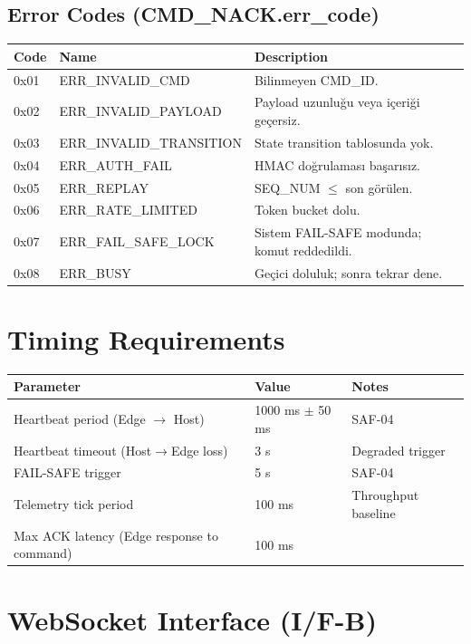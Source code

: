 \documentclass[11pt, a4paper]{article}
\begin{document}
\subsection{Error Codes (CMD\_NACK.err\_code)}
\begin{tabularx}{\textwidth}{|l|l|X|}
\hline
\textbf{Code} & \textbf{Name} & \textbf{Description} \\
\hline
0x01 & ERR\_INVALID\_CMD        & Bilinmeyen CMD\_ID. \\
0x02 & ERR\_INVALID\_PAYLOAD    & Payload uzunluğu veya içeriği geçersiz. \\
0x03 & ERR\_INVALID\_TRANSITION & State transition tablosunda yok. \\
0x04 & ERR\_AUTH\_FAIL          & HMAC doğrulaması başarısız. \\
0x05 & ERR\_REPLAY              & SEQ\_NUM $\leq$ son görülen. \\
0x06 & ERR\_RATE\_LIMITED       & Token bucket dolu. \\
0x07 & ERR\_FAIL\_SAFE\_LOCK    & Sistem FAIL-SAFE modunda; komut reddedildi. \\
0x08 & ERR\_BUSY                & Geçici doluluk; sonra tekrar dene. \\
\hline
\end{tabularx}

\section{Timing Requirements}

\begin{tabularx}{\textwidth}{|l|l|X|}
\hline
\textbf{Parameter} & \textbf{Value} & \textbf{Notes} \\
\hline
Heartbeat period (Edge $\to$ Host) & 1000 ms $\pm$ 50 ms & SAF-04 \\
Heartbeat timeout (Host$\to$Edge loss) & 3 s & Degraded trigger \\
FAIL-SAFE trigger & 5 s & SAF-04 \\
Telemetry tick period & 100 ms & Throughput baseline \\
Max ACK latency (Edge response to command) & 100 ms & \\
\hline
\end{tabularx}

\section{WebSocket Interface (I/F-B)}
\end{document}
